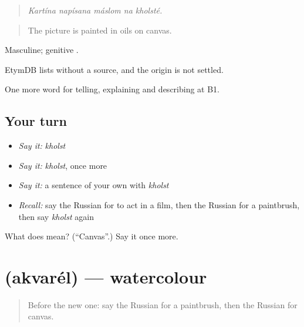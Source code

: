 \begin{quote}
\emph{Kartína napísana máslom na kholsté.}
\end{quote}

\begin{quote}
The picture is painted in oils on canvas.
\end{quote}

Masculine; genitive .

\begin{cousinweb}
EtymDB lists \emph{} without a source, and the origin is not settled.
\end{cousinweb}

\begin{grammarlens}[title={What you've built}]
One more word for telling, explaining and describing at B1.
\end{grammarlens}

\subsection*{Your turn}
\begin{itemize}
\raggedright
  \item \emph{Say it:} \emph{kholst}
  \item \emph{Say it:} \emph{kholst}, once more
  \item \emph{Say it:} a sentence of your own with \emph{kholst}
  \item \emph{Recall:} say the Russian for to act in a film, then the Russian for a paintbrush, then say \emph{kholst} again
\end{itemize}

\begin{tcolorbox}[breakable,colback=teal!4,colframe=teal!35!black,title={Before you move on}]
What does  mean? (\textquotedblleft{}Canvas\textquotedblright{}.) Say it once more.
\end{tcolorbox}
\section[\texorpdfstring{\ru{акварель} (akvarél)}{акварель (akvarél)}]{ (akvarél) — watercolour}

\label{lesson:RU-C521-akvarel}



\begin{quote}
Before the new one: say the Russian for a paintbrush, then the Russian for canvas.
\end{quote}


